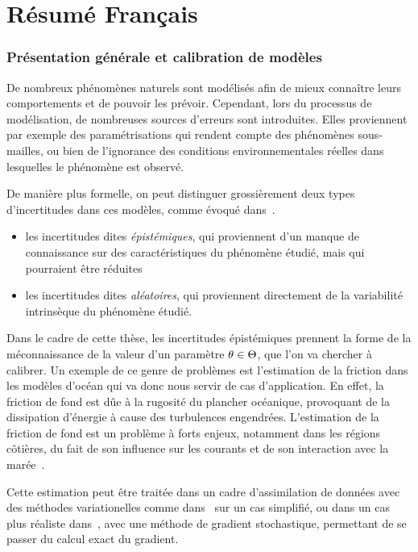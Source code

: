 \documentclass[../../Main_ManuscritThese.tex]{subfiles}
\begin{document}
\chapter*{Résumé Français}
\TitleBtwLines

{}
\label{chap:resume_fr}
\pagestyle{resumeStyle}

\subsection*{Présentation générale et calibration de modèles}
De nombreux phénomènes naturels sont modélisés afin de mieux connaître
leurs comportements et de pouvoir les prévoir.  Cependant, lors du
processus de modélisation, de nombreuses sources d'erreurs sont
introduites. Elles proviennent par exemple des paramétrisations qui
rendent compte des phénomènes sous-mailles, ou bien de l'ignorance des
conditions environnementales réelles dans lesquelles le phénomène est
observé.

De manière plus formelle, on peut distinguer grossièrement deux types d'incertitudes
dans ces modèles, comme évoqué dans~\cite{walker_defining_2003}.
\begin{itemize}
\item les incertitudes dites \emph{épistémiques}, qui proviennent d'un
  manque de connaissance sur des caractéristiques du phénomène
  étudié, mais qui pourraient être réduites
\item les incertitudes dites \emph{aléatoires}, qui proviennent
  directement de la variabilité intrinsèque du phénomène étudié.
\end{itemize}

Dans le cadre de cette thèse, les incertitudes épistémiques prennent
la forme de la méconnaissance de la valeur d'un paramètre
$\theta \in \Theta$, que l'on va chercher à calibrer. Un exemple de ce
genre de problèmes est l'estimation de la friction dans les modèles
d'océan qui va donc nous servir de cas d'application. En effet, la
friction de fond est dûe à la rugosité du plancher océanique,
provoquant de la dissipation d'énergie à cause des turbulences
engendrées. L'estimation de la friction de fond est un problème à
forts enjeux, notamment dans les régions côtières, du fait de son
influence sur les courants et de son interaction avec la
marée~\cite{sinha_principal_1997,boutet_estimation_2015}.

Cette estimation peut être traitée dans un cadre
d'assimilation de données avec des méthodes variationelles comme
dans~\cite{das_estimation_1991,das_variational_1992} sur un cas
simplifié, ou dans un cas plus réaliste
dans~\cite{boutet_estimation_2015}, avec une méthode de gradient
stochastique, permettant de se passer du calcul exact du gradient.
\end{document}
